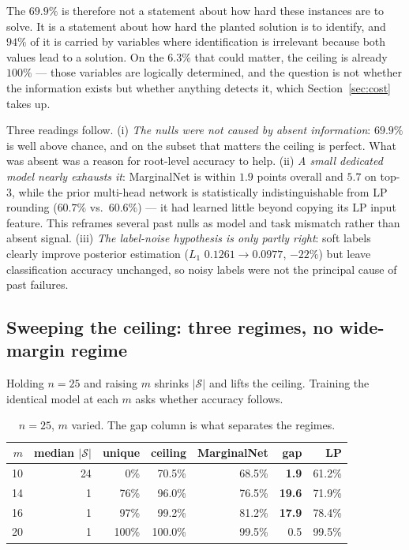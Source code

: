 \documentclass[12pt]{article}
\begin{document}
The $69.9\%$ is therefore not a statement about how hard these instances are to solve. It is a statement about how hard the planted solution is to identify, and $94\%$ of it is carried by variables where identification is irrelevant because both values lead to a solution. On the $6.3\%$ that could matter, the ceiling is already $100\%$ --- those variables are logically determined, and the question is not whether the information exists but whether anything detects it, which Section~\ref{sec:cost} takes up.

Three readings follow. (i) \emph{The nulls were not caused by absent information}: $69.9\%$ is well above chance, and on the subset that matters the ceiling is perfect. What was absent was a reason for root-level accuracy to help. (ii) \emph{A small dedicated model nearly exhausts it}: MarginalNet is within $1.9$ points overall and $5.7$ on top-3, while the prior multi-head network is statistically indistinguishable from LP rounding ($60.7\%$ vs.\ $60.6\%$) --- it had learned little beyond copying its LP input feature. This reframes several past nulls as model and task mismatch rather than absent signal. (iii) \emph{The label-noise hypothesis is only partly right}: soft labels clearly improve posterior estimation ($L_1$ $0.1261\to0.0977$, $-22\%$) but leave classification accuracy unchanged, so noisy labels were not the principal cause of past failures.

\subsection{Sweeping the ceiling: three regimes, no wide-margin regime}
\label{sec:sweep}

Holding $n=25$ and raising $m$ shrinks $|\mathcal{S}|$ and lifts the ceiling. Training the identical model at each $m$ asks whether accuracy follows.

\begin{table}[h]
\centering
\begin{tabular}{rrrrrrr}
\toprule
$m$ & median $|\mathcal{S}|$ & unique & ceiling & MarginalNet & gap & LP \\
\midrule
10 & 24 & 0\% & 70.5\% & 68.5\% & \textbf{1.9} & 61.2\% \\
14 & 1 & 76\% & 96.0\% & 76.5\% & \textbf{19.6} & 71.9\% \\
16 & 1 & 97\% & 99.2\% & 81.2\% & \textbf{17.9} & 78.4\% \\
20 & 1 & 100\% & 100.0\% & 99.5\% & 0.5 & 99.5\% \\
\bottomrule
\end{tabular}
\caption{$n=25$, $m$ varied. The gap column is what separates the regimes.}
\label{tab:sweep}
\end{table}
\end{document}
